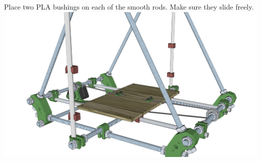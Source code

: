 \documentclass[twoside,openany,a4paper,titlepage]{memoir}
\begin{document}
	\section{}
	Place two PLA bushings on each of the smooth rods. Make sure they slide freely.\\
	\includegraphics[width=1\linewidth]{graphics/ch8_9.png}
	
\end{document}
